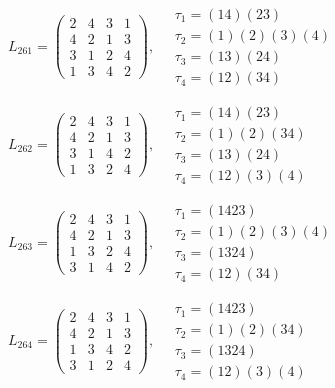 $L_{261} = \begin{pmatrix} 2 & 4 & 3 & 1 \\ 4 & 2 & 1 & 3 \\ 3 & 1 & 2 & 4 \\ 1 & 3 & 4 & 2 \end{pmatrix}, \quad \begin{matrix} \tau_{1} = (1 4)(2 3) \\ \tau_{2} = (1)(2)(3)(4) \\ \tau_{3} = (1 3)(2 4) \\ \tau_{4} = (1 2)(3 4) \end{matrix}$

$L_{262} = \begin{pmatrix} 2 & 4 & 3 & 1 \\ 4 & 2 & 1 & 3 \\ 3 & 1 & 4 & 2 \\ 1 & 3 & 2 & 4 \end{pmatrix}, \quad \begin{matrix} \tau_{1} = (1 4)(2 3) \\ \tau_{2} = (1)(2)(3 4) \\ \tau_{3} = (1 3)(2 4) \\ \tau_{4} = (1 2)(3)(4) \end{matrix}$

$L_{263} = \begin{pmatrix} 2 & 4 & 3 & 1 \\ 4 & 2 & 1 & 3 \\ 1 & 3 & 2 & 4 \\ 3 & 1 & 4 & 2 \end{pmatrix}, \quad \begin{matrix} \tau_{1} = (1 4 2 3) \\ \tau_{2} = (1)(2)(3)(4) \\ \tau_{3} = (1 3 2 4) \\ \tau_{4} = (1 2)(3 4) \end{matrix}$

$L_{264} = \begin{pmatrix} 2 & 4 & 3 & 1 \\ 4 & 2 & 1 & 3 \\ 1 & 3 & 4 & 2 \\ 3 & 1 & 2 & 4 \end{pmatrix}, \quad \begin{matrix} \tau_{1} = (1 4 2 3) \\ \tau_{2} = (1)(2)(3 4) \\ \tau_{3} = (1 3 2 4) \\ \tau_{4} = (1 2)(3)(4) \end{matrix}$

